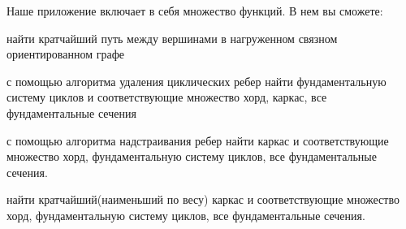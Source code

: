 Наше приложение включает в себя множество функций. В нем вы сможете\+:
\begin{DoxyItemize}
\item найти кратчайший путь между вершинами в нагруженном связном ориентированном графе
\item с помощью алгоритма удаления циклических ребер найти фундаментальную систему циклов и соответствующие множество хорд, каркас, все фундаментальные сечения
\item с помощью алгоритма надстраивания ребер найти каркас и соответствующие множество хорд, фундаментальную систему циклов, все фундаментальные сечения.
\item найти кратчайший(наименьший по весу) каркас и соответствующие множество хорд, фундаментальную систему циклов, все фундаментальные сечения. 
\end{DoxyItemize}
